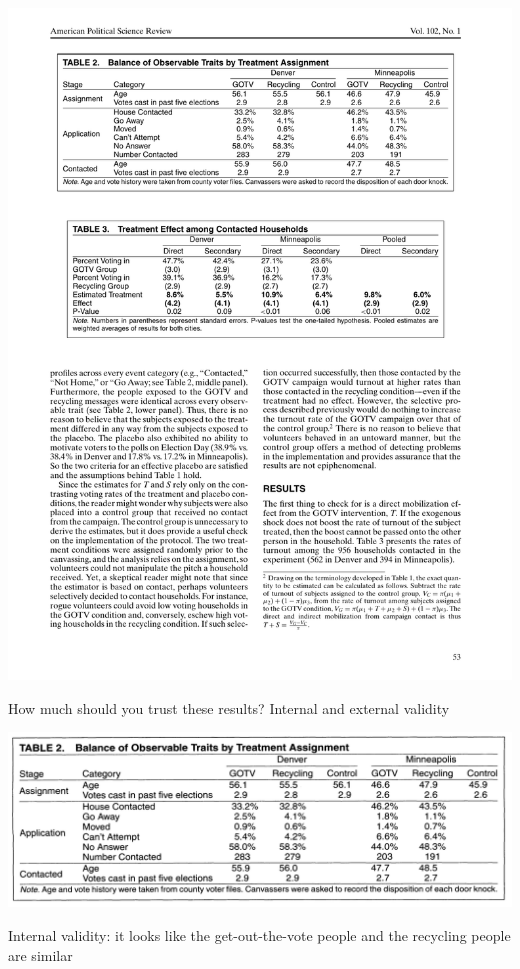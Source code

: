 \documentclass[aspectratio=169]{beamer}
\begin{document}
\begin{frame}

\begin{center}
\includegraphics[width=1\textwidth]{figures/nickerson_voting_2008_tab3}
\end{center}

\end{frame}
\begin{frame}

How much should you trust these results? Internal and external validity

\end{frame}
\begin{frame}

\begin{center}
\includegraphics[width=1\textwidth]{figures/nickerson_voting_2008_tab2}
\end{center}

Internal validity: it looks like the get-out-the-vote people and the recycling people are similar


\end{frame}
\end{document}
